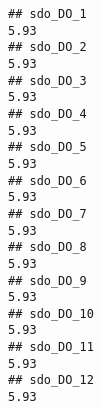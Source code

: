 \documentclass[
]{article}
\begin{document}
\begin{verbatim}
## sdo_DO_1                                                                                                                                                                                                                     5.93
## sdo_DO_2                                                                                                                                                                                                                     5.93
## sdo_DO_3                                                                                                                                                                                                                     5.93
## sdo_DO_4                                                                                                                                                                                                                     5.93
## sdo_DO_5                                                                                                                                                                                                                     5.93
## sdo_DO_6                                                                                                                                                                                                                     5.93
## sdo_DO_7                                                                                                                                                                                                                     5.93
## sdo_DO_8                                                                                                                                                                                                                     5.93
## sdo_DO_9                                                                                                                                                                                                                     5.93
## sdo_DO_10                                                                                                                                                                                                                    5.93
## sdo_DO_11                                                                                                                                                                                                                    5.93
## sdo_DO_12                                                                                                                                                                                                                    5.93

\end{verbatim}
\end{document}
